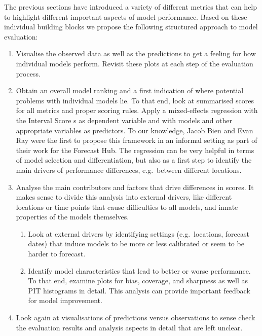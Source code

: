 \documentclass[
]{book}
\providecommand{\tightlist}{%
  \setlength{\itemsep}{0pt}\setlength{\parskip}{0pt}}
\begin{document}
The previous sections have introduced a variety of different metrics that can help to highlight different important aspects of model performance. Based on these individual building blocks we propose the following structured approach to model evaluation:

\begin{enumerate}
\def\labelenumi{\arabic{enumi}.}
\tightlist
\item
  Visualise the observed data as well as the predictions to get a feeling for how individual models perform. Revisit these plots at each step of the evaluation process.
\item
  Obtain an overall model ranking and a first indication of where potential problems with individual models lie. To that end, look at summarised scores for all metrics and proper scoring rules. Apply a mixed-effects regression with the Interval Score s as dependent variable and with models and other appropriate variables as predictors. To our knowledge, Jacob Bien and Evan Ray were the first to propose this framework in an informal setting as part of their work for the Forecast Hub. The regression can be very helpful in terms of model selection and differentiation, but also as a first step to identify the main drivers of performance differences, e.g.~between different locations.
\item
  Analyse the main contributors and factors that drive differences in scores. It makes sense to divide this analysis into external drivers, like different locations or time points that cause difficulties to all models, and innate properties of the models themselves.

  \begin{enumerate}
  \def\labelenumii{\alph{enumii})}
  \tightlist
  \item
    Look at external drivers by identifying settings (e.g.~locations, forecast dates) that induce models to be more or less calibrated or seem to be harder to forecast.
  \item
    Identify model characteristics that lead to better or worse performance. To that end, examine plots for bias, coverage, and sharpness as well as PIT histograms in detail. This analysis can provide important feedback for model improvement.
  \end{enumerate}
\item
  Look again at visualisations of predictions versus observations to sense check the evaluation results and analysis aspects in detail that are left unclear.
\end{enumerate}
\end{document}
